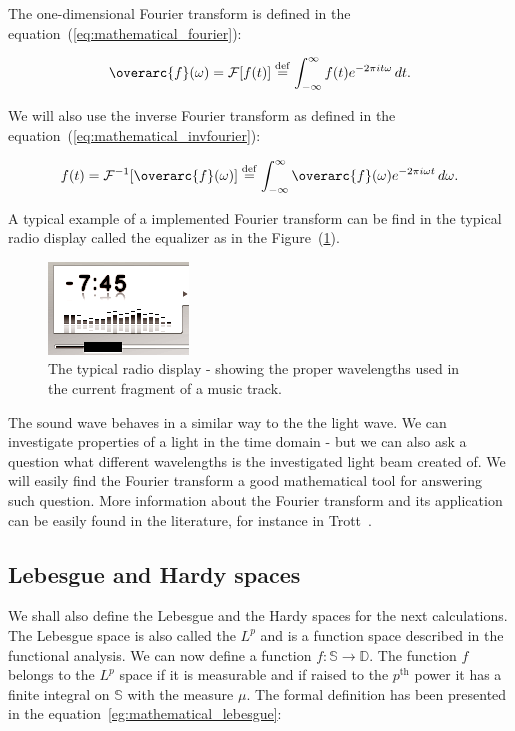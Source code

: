 \documentclass[12pt,twoside,a4paper]{article}
\numberwithin{equation}{subsection}
\numberwithin{figure}{subsection}
\begin{document}
The one-dimensional Fourier transform is defined in the equation~(\ref{eq:mathematical_fourier}):

\begin{equation} \label{eq:mathematical_fourier}
  \overarc{f}(\omega) = \mathcal{F}[f(t)] \stackrel{\mathrm{def}}{=} \int_{- \infty} ^ {\infty} f(t) e ^{-2 \pi i t \omega} \, dt .
\end{equation}

We will also use the inverse Fourier transform as defined in the equation~(\ref{eq:mathematical_invfourier}):

\begin{equation} \label{eq:mathematical_invfourier}
  f(t) = \mathcal{F}^{-1}[\overarc{f}(\omega)] \stackrel{\mathrm{def}}{=} \int_{- \infty} ^ {\infty} \overarc{f}(\omega) e ^{-2 \pi i
  \omega t} \, d\omega .
\end{equation}

A typical example of a implemented Fourier transform can be find in the typical radio display called the equalizer as in the
Figure~(\ref{fig:mathematical_equalizer}).

\begin{figure} 
 \includegraphics{img/equalizer.png}
 \caption{The typical radio display - showing the proper wavelengths used in the current fragment of a music track.
 \label{fig:mathematical_equalizer}}
\end{figure} 

The sound wave behaves in a similar way to the the light wave. We can investigate properties of a light in the time domain - but we can also
ask a question what different wavelengths is the investigated light beam created of. We will easily find the Fourier transform a good
mathematical tool for answering such question. More information about the Fourier transform and its application can be easily found in the
literature, for instance in Trott~\cite{trott_mathematica}.

\subsection{Lebesgue and Hardy spaces}

We shall also define the Lebesgue and the Hardy spaces for the next calculations. The Lebesgue space is also called the $L^p$ and is a
function space described in the functional analysis. We can now define a function $f : \mathbb{S} \to \mathbb{D}$. The function $f$ belongs
to the $L^p$ space if it is measurable and if raised to the $p^{\text{th}}$ power it has a finite integral on $\mathbb{S}$ with the measure
$ \mu $. The formal definition has been presented in the equation~\ref{eg:mathematical_lebesgue}:
\end{document}

